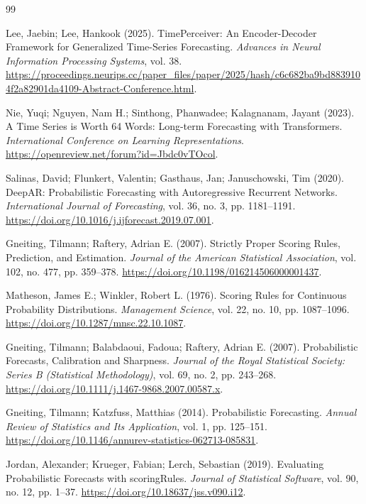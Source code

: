 \begin{thebibliography}{99}

 Lee, Jaebin; Lee, Hankook (2025). TimePerceiver: An Encoder-Decoder Framework for Generalized Time-Series Forecasting. \emph{Advances in Neural Information Processing Systems}, vol. 38. \url{https://proceedings.neurips.cc/paper_files/paper/2025/hash/c6c682ba9bd8839104f2a82901da4109-Abstract-Conference.html}.

 Nie, Yuqi; Nguyen, Nam H.; Sinthong, Phanwadee; Kalagnanam, Jayant (2023). A Time Series is Worth 64 Words: Long-term Forecasting with Transformers. \emph{International Conference on Learning Representations}. \url{https://openreview.net/forum?id=Jbdc0vTOcol}.

 Salinas, David; Flunkert, Valentin; Gasthaus, Jan; Januschowski, Tim (2020). {DeepAR}: Probabilistic Forecasting with Autoregressive Recurrent Networks. \emph{International Journal of Forecasting}, vol. 36, no. 3, pp. 1181--1191. \url{https://doi.org/10.1016/j.ijforecast.2019.07.001}.

 Gneiting, Tilmann; Raftery, Adrian E. (2007). Strictly Proper Scoring Rules, Prediction, and Estimation. \emph{Journal of the American Statistical Association}, vol. 102, no. 477, pp. 359--378. \url{https://doi.org/10.1198/016214506000001437}.

 Matheson, James E.; Winkler, Robert L. (1976). Scoring Rules for Continuous Probability Distributions. \emph{Management Science}, vol. 22, no. 10, pp. 1087--1096. \url{https://doi.org/10.1287/mnsc.22.10.1087}.

 Gneiting, Tilmann; Balabdaoui, Fadoua; Raftery, Adrian E. (2007). Probabilistic Forecasts, Calibration and Sharpness. \emph{Journal of the Royal Statistical Society: Series B (Statistical Methodology)}, vol. 69, no. 2, pp. 243--268. \url{https://doi.org/10.1111/j.1467-9868.2007.00587.x}.

 Gneiting, Tilmann; Katzfuss, Matthias (2014). Probabilistic Forecasting. \emph{Annual Review of Statistics and Its Application}, vol. 1, pp. 125--151. \url{https://doi.org/10.1146/annurev-statistics-062713-085831}.

 Jordan, Alexander; Krueger, Fabian; Lerch, Sebastian (2019). Evaluating Probabilistic Forecasts with scoringRules. \emph{Journal of Statistical Software}, vol. 90, no. 12, pp. 1--37. \url{https://doi.org/10.18637/jss.v090.i12}.


\end{thebibliography}

